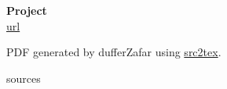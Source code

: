 \documentclass{article}
\begin{document}

\title{}
\author{Shadab Zafar}

\begin{titlepage}
   \begin{center}
    \Huge
    \textbf{Project} \\


    \LARGE
    \href{url}{url}


    \large
    PDF generated by dufferZafar using \href{http://github.com/dufferzafar/src2tex}{src2tex}.
   \end{center}
\end{titlepage}

\newpage

\tableofcontents
\newpage


{{sources}}

\end{document}
